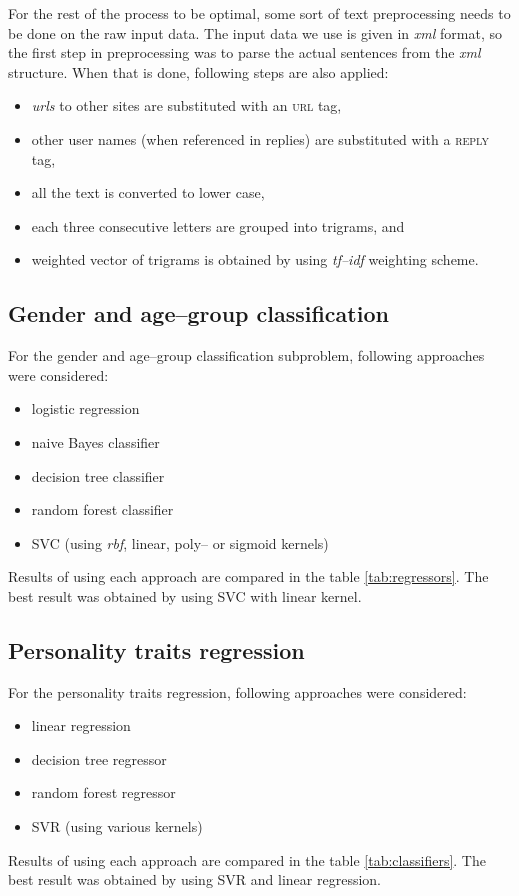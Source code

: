 \documentclass[10pt, a4paper]{article}
\begin{document}
For the rest of the process to be optimal, some sort of text preprocessing needs to be done on the raw input data.
The input data we use is given in \textit{xml} format, so the first step in preprocessing was to parse the actual sentences from the \textit{xml} structure.
When that is done, following steps are also applied:
\begin{itemize}
	\item \textit{urls} to other sites are substituted with an \textsc{url} tag,
	\item other user names (when referenced in replies) are substituted with a \textsc{reply} tag,
	\item all the text is converted to lower case,
	\item each three consecutive letters are grouped into trigrams, and
	\item weighted vector of trigrams is obtained by using \textit{tf--idf} weighting scheme.
\end{itemize}

\subsection{Gender and age--group classification}

For the gender and age--group classification subproblem, following approaches were considered:
\begin{itemize}
	\item logistic regression
	\item naive Bayes classifier
	\item decision tree classifier
	\item random forest classifier
	\item SVC (using \textit{rbf}, linear, poly-- or sigmoid kernels)
\end{itemize}
\noindent Results of using each approach are compared in the table \ref{tab:regressors}. The best result was obtained by using SVC with linear kernel.

\subsection{Personality traits regression}
For the personality traits regression, following approaches were considered:
\begin{itemize}
	\item linear regression
	\item decision tree regressor
	\item random forest regressor
	\item SVR (using various kernels)
\end{itemize}
\noindent Results of using each approach are compared in the table \ref{tab:classifiers}. The best result was obtained by using SVR and linear regression.
\end{document}
